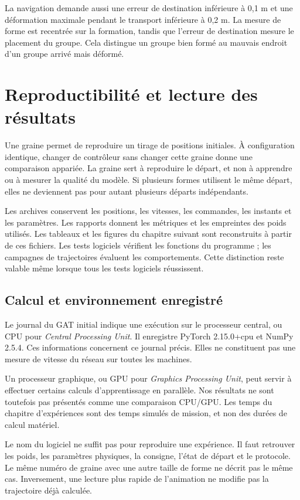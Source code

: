 La navigation demande aussi une erreur de destination inférieure à 0,1 m et une déformation maximale pendant le transport inférieure à 0,2 m. La mesure de forme est recentrée sur la formation, tandis que l'erreur de destination mesure le placement du groupe. Cela distingue un groupe bien formé au mauvais endroit d'un groupe arrivé mais déformé.

\section{Reproductibilité et lecture des résultats}
Une graine permet de reproduire un tirage de positions initiales. À configuration identique, changer de contrôleur sans changer cette graine donne une comparaison appariée. La graine sert à reproduire le départ, et non à apprendre ou à mesurer la qualité du modèle. Si plusieurs formes utilisent le même départ, elles ne deviennent pas pour autant plusieurs départs indépendants.

Les archives conservent les positions, les vitesses, les commandes, les instants et les paramètres. Les rapports donnent les métriques et les empreintes des poids utilisés. Les tableaux et les figures du chapitre suivant sont reconstruits à partir de ces fichiers. Les tests logiciels vérifient les fonctions du programme ; les campagnes de trajectoires évaluent les comportements. Cette distinction reste valable même lorsque tous les tests logiciels réussissent.



\subsection{Calcul et environnement enregistré}
Le journal du GAT initial indique une exécution sur le processeur central, ou CPU pour \textit{Central Processing Unit}. Il enregistre PyTorch 2.15.0+cpu et NumPy 2.5.4. Ces informations concernent ce journal précis. Elles ne constituent pas une mesure de vitesse du réseau sur toutes les machines.

Un processeur graphique, ou GPU pour \textit{Graphics Processing Unit}, peut servir à effectuer certains calculs d'apprentissage en parallèle. Nos résultats ne sont toutefois pas présentés comme une comparaison CPU/GPU. Les temps du chapitre d'expériences sont des temps simulés de mission, et non des durées de calcul matériel.

Le nom du logiciel ne suffit pas pour reproduire une expérience. Il faut retrouver les poids, les paramètres physiques, la consigne, l'état de départ et le protocole. Le même numéro de graine avec une autre taille de forme ne décrit pas le même cas. Inversement, une lecture plus rapide de l'animation ne modifie pas la trajectoire déjà calculée.

